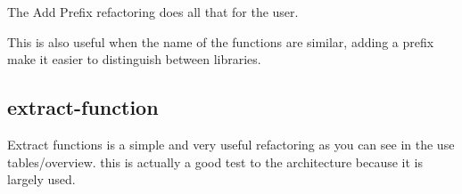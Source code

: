 The Add Prefix refactoring does all that for the user.

This is also useful when the name of the functions are similar, adding a prefix make it easier to distinguish between libraries.


\subsection{extract-function}

Extract functions is a simple and very useful refactoring as you can see in the use tables/overview. this is actually a good test to the architecture because it is largely used.
